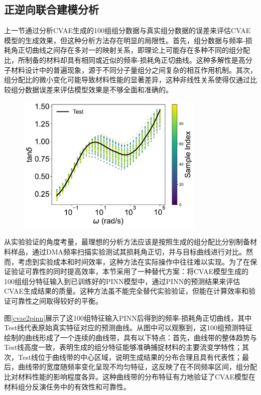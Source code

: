 \subsection{正逆向联合建模分析}

上一节通过分析CVAE生成的100组组分数据与真实组分数据的误差来评估CVAE模型的生成效果，但这种分析方法存在明显的局限性。首先，组分数据与频率-损耗角正切曲线之间存在多对一的映射关系，即理论上可能存在多种不同的组分配比，所制备的材料却具有相同或近似的频率-损耗角正切曲线。这种多解性是高分子材料设计中的普遍现象，源于不同分子量组分之间复杂的相互作用机制。其次，组分配比的微小变化可能导致材料性能的显著差异，这种非线性关系使得仅通过比较组分数据误差来评估模型效果是不够全面和准确的。
\begin{figure}[htbp]
  \centering
  \includegraphics[width=0.8\textwidth]{Fig/prediction_results.pdf}
\end{figure}
从实验验证的角度考量，最理想的分析方法应该是按照生成的组分配比分别制备材料样品，通过DMA频率扫描实验测试其损耗角正切，并与目标曲线进行对比。然而，考虑到实验成本和时间效率，这种方法在实际操作中往往难以实现。为了在保证验证可靠性的同时提高效率，本节采用了一种替代方案：将CVAE模型生成的100组组分特征输入到已训练好的PINN模型中，通过PINN的预测结果来评估CVAE生成结果的质量。这种方法虽不能完全替代实验验证，但能在计算效率和验证可靠性之间取得较好的平衡。

图\ref{cvae2pinn}展示了这100组特征输入PINN后得到的频率-损耗角正切曲线，其中Test线代表原始真实特征对应的预测曲线。从图中可以观察到，这100组预测特征绘制的曲线形成了一个连续的曲线带，具有以下特点：首先，曲线带的整体趋势与Test线高度一致，表明生成的组分特征能够准确捕捉材料的主要流变学特性；其次，Test线位于曲线带的中心区域，说明生成结果的分布合理且具有代表性；最后，曲线带的宽度随频率变化呈现不均匀特征，这反映了在不同频率区间，组分配比对材料性能的影响程度各异。这种曲线带的分布特征有力地验证了CVAE模型在材料组分反演任务中的有效性和可靠性。

